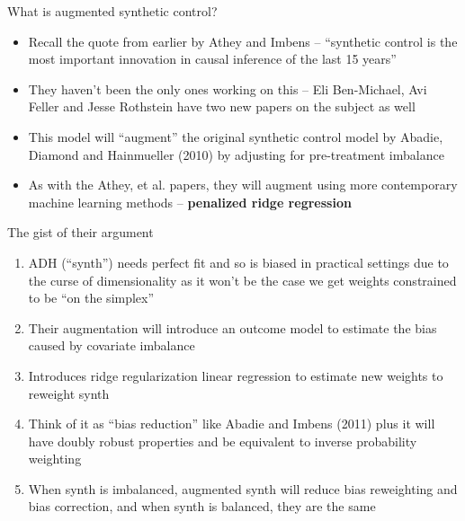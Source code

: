 \documentclass{beamer}
\begin{document}
\begin{frame}{What is augmented synthetic control?}

\begin{itemize}
\item Recall the quote from earlier by Athey and Imbens -- ``synthetic control is the most important innovation in causal inference of the last 15 years''
\item They haven't been the only ones working on this -- Eli Ben-Michael, Avi Feller and Jesse Rothstein have two new papers on the subject as well
\item This model will ``augment'' the original synthetic control model by Abadie, Diamond and Hainmueller (2010) by adjusting for pre-treatment imbalance
\item As with the Athey, et al. papers, they will augment using more contemporary machine learning methods -- \textbf{penalized ridge regression}
\end{itemize}

\end{frame}


\begin{frame}{The gist of their argument}

\begin{enumerate}
\item ADH (``synth'') needs perfect fit and so is biased in practical settings due to the curse of dimensionality as it won't be the case we get weights constrained to be ``on the simplex''
\item Their augmentation will introduce an outcome model to estimate the bias caused by covariate imbalance 
\item Introduces ridge regularization linear regression to estimate new weights to reweight synth
\item Think of it as ``bias reduction'' like Abadie and Imbens (2011) plus it will have doubly robust properties and be equivalent to inverse probability weighting
\item When synth is imbalanced, augmented synth will reduce bias reweighting and bias correction, and when synth is balanced, they are the same
\end{enumerate}

\end{frame}
\end{document}
